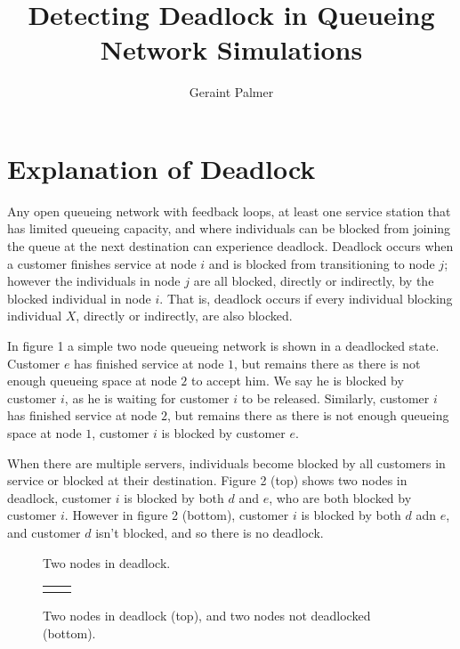 \documentclass{article}
\title{Detecting Deadlock in Queueing Network Simulations}
\author{Geraint Palmer}
\date{}
\begin{document}
\onehalfspacing

\maketitle

\section{Explanation of Deadlock}

Any open queueing network with feedback loops, at least one service station that has limited queueing capacity, and where individuals can be blocked from joining the queue at the next destination can experience deadlock.
Deadlock occurs when a customer finishes service at node $i$ and is blocked from transitioning to node $j$; however the individuals in node $j$ are all blocked, directly or indirectly, by the blocked individual in node $i$.
That is, deadlock occurs if every individual blocking individual $X$, directly or indirectly, are also blocked.\newline

In figure 1 a simple two node queueing network is shown in a deadlocked state.
Customer $e$ has finished service at node $1$, but remains there as there is not enough queueing space at node $2$ to accept him.
We say he is blocked by customer $i$, as he is waiting for customer $i$ to be released.
Similarly, customer $i$ has finished service at node $2$, but remains there as there is not enough queueing space at node $1$, customer $i$ is blocked by customer $e$.\newline

When there are multiple servers, individuals become blocked by all customers in service or blocked at their destination.
Figure 2 (top) shows two nodes in deadlock, customer $i$ is blocked by both $d$ and $e$, who are both blocked by customer $i$.
However in figure 2 (bottom), customer $i$ is blocked by both $d$ adn $e$, and customer $d$ isn't blocked, and so there is no deadlock.\newline

\begin{figure}[H]
  
  \caption{Two nodes in deadlock.}
\end{figure}

\begin{figure}[H]
  \begin{tabular}{c c}
     \\
    \\
    
  \end{tabular}
  \caption{Two nodes in deadlock (top), and two nodes not deadlocked (bottom).}
\end{figure}
\end{document}
